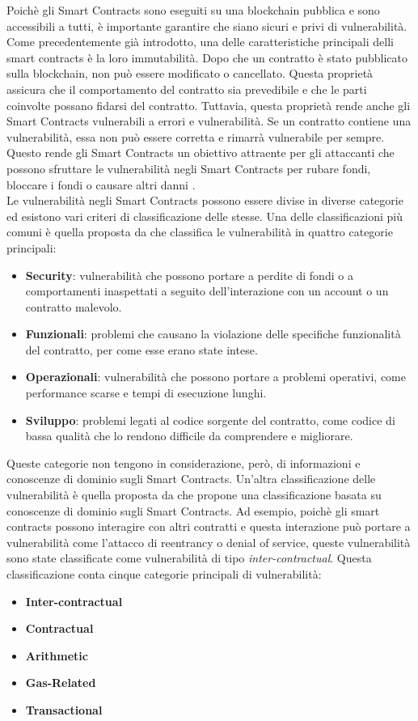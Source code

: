 \documentclass[../../Thesis.tex]{subfiles}
\begin{document}
Poich\`e gli Smart Contracts sono eseguiti su una blockchain pubblica e sono accessibili a tutti, \`e importante garantire che siano sicuri e privi di vulnerabilit\`a. Come precedentemente gi\`a introdotto, una delle caratteristiche principali delli smart contracts \`e la loro immutabilit\`a. Dopo che un contratto \`e stato pubblicato sulla blockchain, non pu\`o essere modificato o cancellato. Questa propriet\`a assicura che il comportamento del contratto sia prevedibile e che le parti coinvolte possano fidarsi del contratto. Tuttavia, questa propriet\`a rende anche gli Smart Contracts vulnerabili a errori e vulnerabilit\`a. Se un contratto contiene una vulnerabilit\`a, essa non pu\`o essere corretta e rimarr\`a vulnerabile per sempre. Questo rende gli Smart Contracts un obiettivo attraente per gli attaccanti che possono sfruttare le vulnerabilit\`a negli Smart Contracts per rubare fondi, bloccare i fondi o causare altri danni \cite{SCEnhancement}.\\
Le vulnerabilit\`a negli Smart Contracts possono essere divise in diverse categorie ed esistono vari criteri di classificazione delle stesse. Una delle classificazioni pi\`u comuni \`e quella proposta da \cite{SmartCheck} che classifica le vulnerabilit\`a in quattro categorie principali:
\begin{itemize}
    \item \textbf{Security}: vulnerabilit\`a che possono portare a perdite di fondi o a comportamenti inaspettati a seguito dell'interazione con un account o un contratto malevolo.
    \item \textbf{Funzionali}: problemi che causano la violazione delle specifiche funzionalit\`a del contratto, per come esse erano state intese.
    \item \textbf{Operazionali}: vulnerabilit\`a che possono portare a problemi operativi, come performance scarse e tempi di esecuzione lunghi.
    \item \textbf{Sviluppo}: problemi legati al codice sorgente del contratto, come codice di bassa qualit\`a che lo rendono difficile da comprendere e migliorare.
\end{itemize}
Queste categorie non tengono in considerazione, per\`o, di informazioni e conoscenze di dominio sugli Smart Contracts. Un'altra classificazione delle vulnerabilit\`a \`e quella proposta da \cite{sc-vulnerabilities} che propone una classificazione basata su conoscenze di dominio sugli Smart Contracts. Ad esempio, poich\`e gli smart contracts possono interagire con altri contratti e questa interazione pu\`o portare a vulnerabilit\`a come l'attacco di reentrancy o denial of service, queste vulnerabilit\`a sono state classificate come vulnerabilit\`a di tipo \emph{inter-contractual}. Questa classificazione conta cinque categorie principali di vulnerabilit\`a: 
\begin{itemize}
    \item \textbf{Inter-contractual}
    \item \textbf{Contractual}
    \item \textbf{Arithmetic}
    \item \textbf{Gas-Related}
    \item \textbf{Transactional}
\end{itemize}
\end{document}
